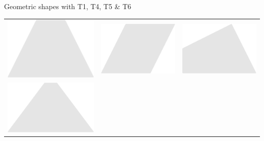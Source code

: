 \documentclass[14pt]{beamer}
\begin{document}
\begin{frame}{Geometric shapes with T1, T4, T5 \& T6}
\begin{center}
\begin{tabular}{ccc}
                    \includegraphics[scale=0.3]{figures/figure023d.pdf} \;\;&
                \;\;\includegraphics[scale=0.3]{figures/figure023f.pdf} \;\;&
                \;\;\includegraphics[scale=0.3]{figures/figure023h.pdf} \\[2ex]
                    \includegraphics[scale=0.3]{figures/figure023e.pdf} \;\;&

\end{tabular}
\end{center}
\end{frame}
\end{document}
